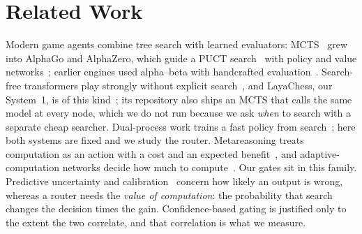 \section{Related Work}
\label{sec:related}
Modern game agents combine tree search with learned evaluators: MCTS~\cite{kocsis2006,browne2012} grew into AlphaGo and AlphaZero, which guide a PUCT search~\cite{rosin2011} with policy and value networks~\cite{silver2016,silver2017,silver2018}; earlier engines used alpha--beta with handcrafted evaluation~\cite{campbell2002,knuth1975}. Search-free transformers play strongly without explicit search~\cite{ruoss2024}, and LayaChess, our System~1, is of this kind~\cite{layachess}; its repository also ships an MCTS that calls the same model at every node, which we do not run because we ask \emph{when} to search with a separate cheap searcher. Dual-process work trains a fast policy from search~\cite{anthony2017,booch2021}; here both systems are fixed and we study the router. Metareasoning treats computation as an action with a cost and an expected benefit~\cite{russell1991,tolpin2012}, and adaptive-computation networks decide how much to compute~\cite{graves2016,teerapittayanon2016}. Our gates sit in this family. Predictive uncertainty and calibration~\cite{guo2017,lakshminarayanan2017,gal2016} concern how likely an output is wrong, whereas a router needs the \emph{value of computation}: the probability that search changes the decision times the gain. Confidence-based gating is justified only to the extent the two correlate, and that correlation is what we measure.
